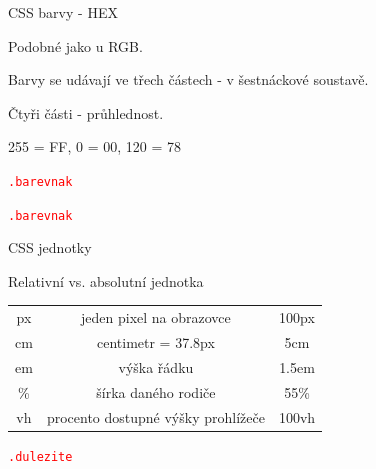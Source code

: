 \documentclass[aspectratio=1610]{beamer}
\begin{document}
\begin{frame}{CSS barvy - HEX}
    \begin{cardTiny}
        \begin{flushleft}
            Podobné jako u RGB.

            Barvy se udávají ve třech částech - v šestnáckové soustavě.

            Čtyři části - průhlednost.

            255 = FF, 0 = 00, 120 = 78

            \begin{alltt}
                \textcolor{red}{.barevnak} \string{\\
                    \textcolor{blue}{color}: \textcolor{orange}{\#FF0000};\\
                \string}
            \end{alltt}

            \begin{alltt}
                \textcolor{red}{.barevnak} \string{\\
                    \textcolor{blue}{color}: \textcolor{orange}{\#FF7878F0};\\
                \string}
            \end{alltt}
        \end{flushleft}
    \end{cardTiny}
\end{frame}

\begin{frame}{CSS jednotky}
    \begin{cardTiny}
        Relativní vs. absolutní jednotka

        \begin{center}
            \begin{tabular}{ |c|c|c| } 
                \hline
                px & jeden pixel na obrazovce & 100px \\ 
                cm & centimetr = 37.8px & 5cm \\ 
                em & výška řádku & 1.5em \\ 
                \% & šírka daného rodiče & 55\% \\ 
                vh & procento dostupné výšky prohlížeče & 100vh \\ 
                \hline
            \end{tabular}
        \end{center}
    \end{cardTiny}

    \begin{cardTiny}
        \begin{alltt}
            \textcolor{red}{.dulezite} \string{\\
                \textcolor{blue}{font-size}: \textcolor{orange}{5em};\\
            \string}
        \end{alltt}
    \end{cardTiny}
\end{frame}
\end{document}
